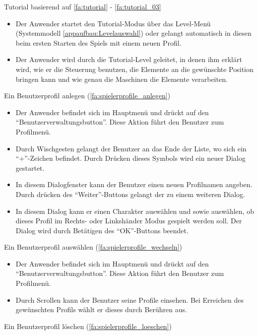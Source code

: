 \documentclass{scrartcl}
\begin{document}
\begin{telist}
	\item Tutorial basierend auf \ref{fa:tutorial} - \ref{fa:tutorial_03}
	\begin{itemize}
		\item Der Anwender startet den Tutorial-Modus über das Level-Menü (Systemmodell \ref{appaufbau:Levelauswahl}) oder gelangt automatisch in diesen beim ersten Starten des Spiels mit einem neuen Profil.
		\item Der Anwender wird durch die Tutorial-Level geleitet, in denen ihm erklärt wird, wie er die Steuerung benutzen, die Elemente an die gewünschte Position bringen kann und wie genau die Maschinen die Elemente verarbeiten.
	\end{itemize}

	\item Ein Benutzerprofil anlegen (\ref{fa:spielerprofile_anlegen})
	\begin{itemize}
		\item Der Anwender befindet sich im Hauptmenü und drückt auf den \enquote{Benutzerverwaltungsbutton}. Diese Aktion führt den Benutzer zum Profilmenü.
		\item Durch Wischgesten gelangt der Benutzer an das Ende der Liste, wo sich ein \enquote{+}-Zeichen befindet. Durch Drücken dieses Symbols wird ein neuer Dialog gestartet.
		\item In diesem Dialogfenster kann der Benutzer einen neuen Profilnamen angeben. Durch drücken des \enquote{Weiter}-Buttons gelangt der zu einem weiteren Dialog.
		\item In diesem Dialog kann er einen Charakter auswählen und sowie auswählen, ob dieses Profil im Rechts- oder Linkshänder Modus gespielt werden soll. Der Dialog wird durch Betätigen des \enquote{OK}-Buttons beendet.
	\end{itemize}
	\item Ein Benutzerprofil auswählen (\ref{fa:spielerprofile_wechseln})
	\begin{itemize}
		\item Der Anwender befindet sich im Hauptmenü und drückt auf den \enquote{Benutzerverwaltungsbutton}. Diese Aktion führt den Benutzer zum Profilmenü.
		\item Durch Scrollen kann der Benutzer seine Profile einsehen. Bei Erreichen des gewünschten Profils wählt er dieses durch Berühren aus.
	\end{itemize}
	\item Ein Benutzerprofil löschen (\ref{fa:spielerprofile_loeschen})

\end{telist}
\end{document}

